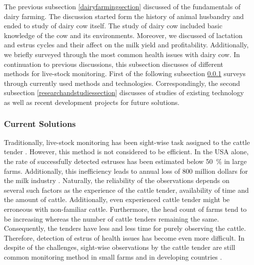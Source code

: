 \documentclass[english,12pt,a4paper,pdftex,elec,utf8]{aaltothesis}
\begin{document}
The previous subsection \ref{dairyfarmingsection} discussed of the fundamentals of dairy farming. The discussion started form the history of animal husbandry and ended to study of dairy cow itself. The study of dairy cow included basic knowledge of the cow and its environments. Moreover, we discussed of lactation and estrus cycles and their affect on the milk yield and profitability. Additionally, we briefly surveyed through the most common health issues with dairy cow. In continuation to previous discussions, this subsection discusses of different methods for live-stock monitoring. First of the following subsection \ref{currentsolutionssection} surveys through currently used methods and technologies. Correspondingly, the second subsection \ref{researchandstudiessection} discusses of studies of existing technology as well as recent development projects for future solutions.  

\subsubsection{Current Solutions} \label{currentsolutionssection}

Traditionally, live-stock monitoring has been sight-wise task assigned to the cattle tender \cite{lehmahavaintoja}. However, this method is not considered to be efficient. In the USA alone, the rate of successfully detected estruses has been estimated below \SI{50}{\percent} in large farms. Additionally, this inefficiency leads to annual loss of 800 million dollars for the milk industry \cite{BRUNASSI2010}. Naturally, the reliability of the observations depends on several such factors as the experience of the cattle tender, availability of time and the amount of cattle. Additionally, even experienced cattle tender might be erroneous with non-familiar cattle. Furthermore, the head count of farms tend to be increasing whereas the number of cattle tenders remaining the same. Consequently, the tenders have less and less time for purely observing the cattle. Therefore, detection of estrus of health issues has become even more difficult. In despite of the challenges, sight-wise observations by the cattle tender are still common monitoring method in small farms and in developing countries \cite{BRUNASSI2010}. 
\end{document}

